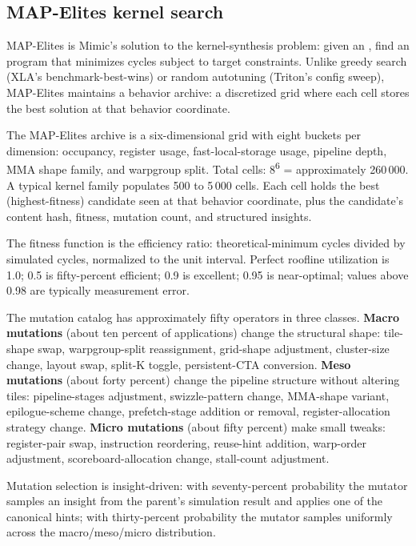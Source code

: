 \subsection{MAP-Elites kernel search}
\label{sec:mimic-map-elites}

MAP-Elites is Mimic's solution to the kernel-synthesis problem: given an  , find an  program that minimizes cycles subject to target constraints.
Unlike greedy search (XLA's benchmark-best-wins) or random autotuning (Triton's config sweep), MAP-Elites maintains a behavior archive: a discretized grid where each cell stores the best solution at that behavior coordinate.

\begin{definition}
\label{def:mimic-archive}
The MAP-Elites archive is a six-dimensional grid with eight buckets per dimension: occupancy, register usage, fast-local-storage usage, pipeline depth, MMA shape family, and warpgroup split.
Total cells: 8\textsuperscript{6} = approximately 260\,000.
A typical kernel family populates 500 to 5\,000 cells.
Each cell holds the best (highest-fitness) candidate seen at that behavior coordinate, plus the candidate's content hash, fitness, mutation count, and structured insights.
\end{definition}

The fitness function is the efficiency ratio: theoretical-minimum cycles divided by simulated cycles, normalized to the unit interval.
Perfect roofline utilization is 1.0; 0.5 is fifty-percent efficient; 0.9 is excellent; 0.95 is near-optimal; values above 0.98 are typically measurement error.

The mutation catalog has approximately fifty operators in three classes.
\textbf{Macro mutations} (about ten percent of applications) change the structural shape: tile-shape swap, warpgroup-split reassignment, grid-shape adjustment, cluster-size change, layout swap, split-K toggle, persistent-CTA conversion.
\textbf{Meso mutations} (about forty percent) change the pipeline structure without altering tiles: pipeline-stages adjustment, swizzle-pattern change, MMA-shape variant, epilogue-scheme change, prefetch-stage addition or removal, register-allocation strategy change.
\textbf{Micro mutations} (about fifty percent) make small tweaks: register-pair swap, instruction reordering, reuse-hint addition, warp-order adjustment, scoreboard-allocation change, stall-count adjustment.

Mutation selection is insight-driven: with seventy-percent probability the mutator samples an insight from the parent's simulation result and applies one of the canonical hints; with thirty-percent probability the mutator samples uniformly across the macro/meso/micro distribution.

